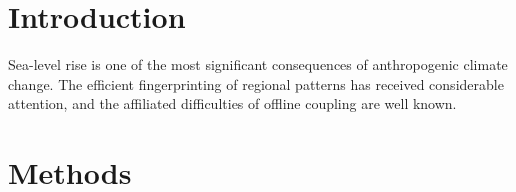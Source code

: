 \documentclass[11pt]{article}
\begin{document}
\section{Introduction}
Sea-level rise is one of the most significant consequences of anthropogenic climate change. The efficient fingerprinting of regional patterns has received considerable attention, and the affiliated difficulties of offline coupling are well known.
\lipsum[1-9]
\section{Methods}
\lipsum[10-14]
\end{document}
